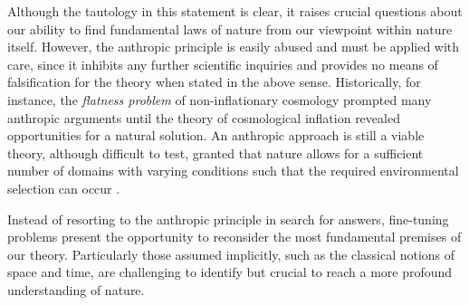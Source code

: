 Although the tautology in this statement is clear, it raises crucial questions about our ability to find fundamental laws of nature from our viewpoint within nature itself. However, the anthropic principle is easily abused and must be applied with care, since it inhibits any further scientific inquiries and provides no means of falsification for the theory when stated in the above sense. Historically, for instance, the \emph{flatness problem} of non-inflationary cosmology prompted many anthropic arguments until the theory of cosmological inflation revealed opportunities for a natural solution. An anthropic approach is still a viable theory, although difficult to test, granted that nature allows for a sufficient number of domains with varying conditions such that the required environmental selection can occur \autocite{Carroll2003}.

Instead of resorting to the anthropic principle in search for answers, fine-tuning problems present the opportunity to reconsider the most fundamental premises of our theory. Particularly those assumed implicitly, such as the classical notions of space and time, are challenging to identify but crucial to reach a more profound understanding of nature.
